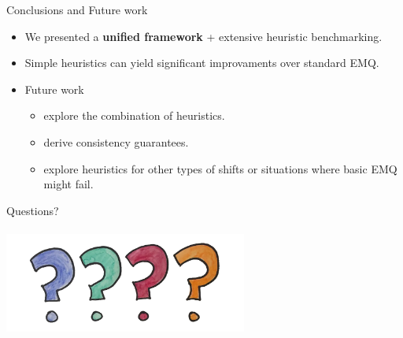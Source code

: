 \documentclass[aspectratio=169]{beamer}
\begin{document}
\begin{frame}{Conclusions and Future work}
  \begin{itemize}
    \item We presented a \textbf{unified framework} + extensive heuristic benchmarking.
    \item Simple heuristics can yield significant improvaments over standard EMQ.
    \item Future work
    \begin{itemize} 
      \item explore the combination of heuristics.
      \item derive consistency guarantees.
      \item explore heuristics for other types of shifts or situations where basic EMQ might fail.
    \end{itemize}
  \end{itemize}
\end{frame}

\begin{frame}
  \centering
  \Huge
Questions?\\
\\
\vspace{1cm}
\includegraphics[width=0.6\textwidth]{images/questions.png}
\end{frame}
\end{document}
